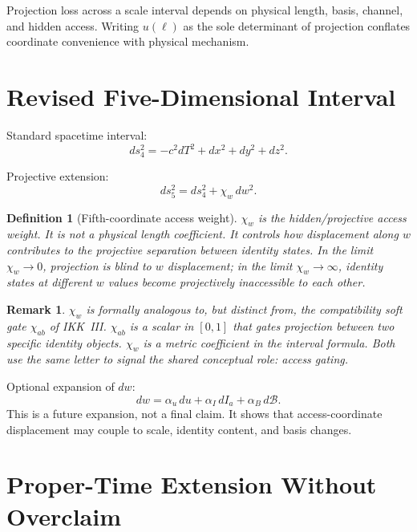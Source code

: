 \documentclass[11pt,a4paper,oneside]{article}
\newtheorem{definition}{Definition}[section]
\newtheorem{remark}{Remark}[section]
\newcommand{\Ia}{I_a}                               %
\newcommand{\wcoord}{w}
\newcommand{\uscale}{u(\ell)}                  %
\newcommand{\chiw}{\chi_w}                     %
\newcommand{\chiab}{\chi_{ab}}                 %
\begin{document}
Projection loss across a scale interval depends on physical length, basis, channel, and hidden access. Writing $\uscale$ as the sole determinant of projection conflates coordinate convenience with physical mechanism.

\section{Revised Five-Dimensional Interval}

Standard spacetime interval:
\[
ds_4^2 = -c^2 dT^2 + dx^2 + dy^2 + dz^2.
\]

Projective extension:
\[
\boxed{ds_5^2 = ds_4^2 + \chiw\, d\wcoord^2.}
\]

\begin{definition}[Fifth-coordinate access weight]
\label{def:chiw}
$\chiw$ is the hidden/projective access weight. It is not a physical length coefficient. It controls how displacement along $\wcoord$ contributes to the projective separation between identity states. In the limit $\chiw \to 0$, projection is blind to $\wcoord$ displacement; in the limit $\chiw \to \infty$, identity states at different $\wcoord$ values become projectively inaccessible to each other.
\end{definition}

\begin{remark}
$\chiw$ is formally analogous to, but distinct from, the compatibility soft gate $\chiab$ of IKK~III. $\chiab$ is a scalar in $[0,1]$ that gates projection between two specific identity objects. $\chiw$ is a metric coefficient in the interval formula. Both use the same letter to signal the shared conceptual role: access gating.
\end{remark}

Optional expansion of $d\wcoord$:
\[
d\wcoord = \alpha_u\, du + \alpha_I\, d\Ia + \alpha_B\, d\mathcal{B}.
\]
This is a future expansion, not a final claim. It shows that access-coordinate displacement may couple to scale, identity content, and basis changes.

\section{Proper-Time Extension Without Overclaim}
\end{document}

